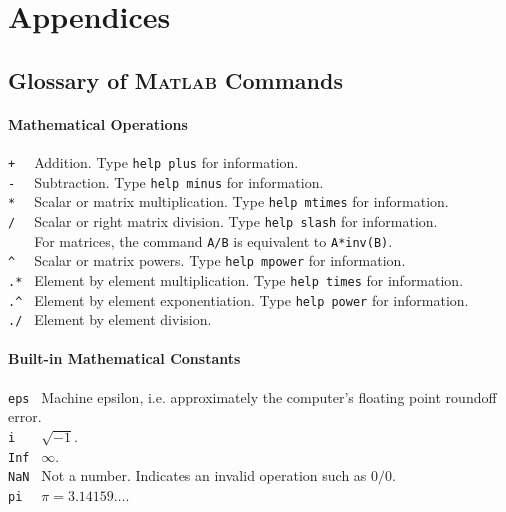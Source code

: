 
\part{Appendices}

\appendix

\renewcommand{\baselinestretch}{1.2}
\normalsize

\chapter{Glossary of \textsc{Matlab} Commands}

\subsection*{Mathematical Operations}
\verb&+  & Addition. Type \verb&help plus& for information.\\
\verb&-  & Subtraction. Type \verb&help minus& for information.\\
\verb&*  & Scalar or matrix multiplication. Type \verb&help mtimes& for information.\\
\verb&/  & Scalar or right matrix division. Type \verb&help slash& for information.\\
\verb&   & For matrices, the command \verb&A/B& is equivalent to \verb&A*inv(B)&.\\
\verb&^  & Scalar or matrix powers. Type \verb&help mpower& for information.\\
\verb&.* & Element by element multiplication. Type \verb&help times& for information.\\
\verb&.^ & Element by element exponentiation. Type \verb&help power& for information.\\
\verb&./ & Element by element division.\\



\subsection*{Built-in Mathematical Constants}
\verb&eps & Machine epsilon, i.e. approximately the computer's floating point
            roundoff error.\\
\verb&i   & $\sqrt{-1}$.\\
\verb&Inf & $\infty$.\\
\verb&NaN & Not a number. Indicates an invalid operation such as $0/0$.\\
\verb&pi  & $\pi = 3.14159 \ldots$.\\


